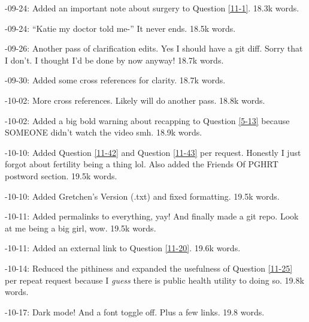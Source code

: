 \documentclass{article}
\begin{document}
-09-24: Added an important note about surgery to Question \ref{11-1}. 18.3k words.

-09-24: “Katie my doctor told me-” It never ends. 18.5k words.

-09-26: Another pass of clarification edits. Yes I should have a git diff. Sorry that I don't. I thought I'd be done by now anyway! 18.7k words.

-09-30: Added some cross references for clarity. 18.7k words.

-10-02: More cross references. Likely will do another pass. 18.8k words.

-10-02: Added a big bold warning about recapping to Question \ref{5-13} because SOMEONE didn't watch the video smh. 18.9k words.

-10-10: Added Question \ref{11-42} and Question \ref{11-43} per request. Honestly I just forgot about fertility being a thing lol. Also added the Friends Of PGHRT postword section. 19.5k words.

-10-10: Added Gretchen's Version (.txt) and fixed formatting. 19.5k words.

-10-11: Added permalinks to everything, yay! And finally made a git repo. Look at me being a big girl, wow. 19.5k words.

-10-11: Added an external link to Question \ref{11-20}. 19.6k words.

-10-14: Reduced the pithiness and expanded the usefulness of Question \ref{11-25} per repeat request because I \textit{guess} there is public health utility to doing so. 19.8k words.

-10-17: Dark mode! And a font toggle off. Plus a few links. 19.8 words.
\end{document}
